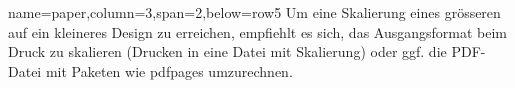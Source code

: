 \documentclass[
	paper=a0,%
	style=ruled, %
	]{bfhsciposter}
\let\pck\textsf
\begin{document}
\begin{tcbposter}[
	poster={
		columns=4,
		rows=7,
		spacing=1cm,
	},]
\begin{posterboxenv}[title=Papierformat]{name=paper,column=3,span=2,below=row5}
	Um eine Skalierung eines grösseren auf ein kleineres Design zu erreichen, empfiehlt es sich, das Ausgangsformat beim Druck zu skalieren (Drucken in eine Datei mit Skalierung) oder ggf. die PDF-Datei mit Paketen wie \pck{pdfpages} umzurechnen.
\end{posterboxenv}

\end{tcbposter}
\end{document}
